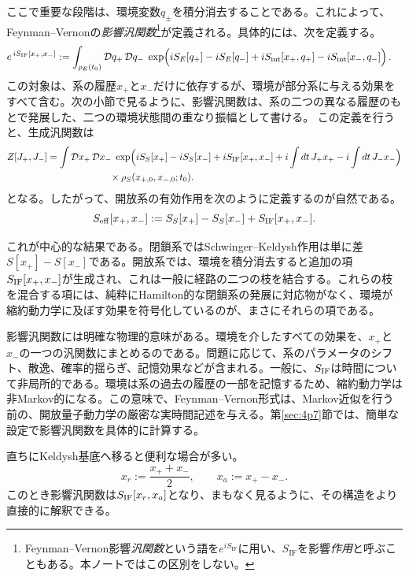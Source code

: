 \documentclass[a4paper,11pt,oneside]{article}
\theoremstyle{definition}
\numberwithin{equation}{section}
\begin{document}
ここで重要な段階は、環境変数\(q_\pm\)を積分消去することである。これによって、Feynman--Vernonの\textit{影響汎関数}\footnote{Feynman--Vernon影響\textit{汎関数}という語を$ e^{iS_{\mathrm{IF}}}$に用い、$S_{\mathrm{IF}}$を影響\textit{作用}と呼ぶこともある。本ノートではこの区別をしない。}\cite{FEYNMAN1963118}が定義される。具体的には、次を定義する。
\begin{align}
e^{\,iS_{\rm IF}[x_+,x_-]}
&:=
\int_{\rho_{E}(t_{0})} \mathcal D q_+\,\mathcal D q_-\;
\exp\Bigl(
iS_E[q_+] - iS_E[q_-]
+iS_{\rm int}[x_+,q_+]
-iS_{\rm int}[x_-,q_-]
\Bigr)\,.
\end{align}
この対象は、系の履歴\(x_+\)と\(x_-\)だけに依存するが、環境が部分系に与える効果をすべて含む。次の小節で見るように、影響汎関数は、系の二つの異なる履歴のもとで発展した、二つの環境状態間の重なり振幅として書ける。
この定義を行うと、生成汎関数は
\begin{align}
Z[J_+,J_-]
&=
\int \mathcal D x_+\,\mathcal D x_-\;
\exp\Bigl(
iS_S[x_+] - iS_S[x_-]
+iS_{\rm IF}[x_+,x_-]
+i\int dt\,J_+x_+
-i\int dt\,J_-x_-
\Bigr)
\nonumber\\
&\hspace{2.3cm}
\times
\rho_S(x_{+,0},x_{-,0};t_0) .
\end{align}
となる。したがって、開放系の有効作用を次のように定義するのが自然である。
\begin{equation}
S_{\rm eff}[x_+,x_-]
:=
S_S[x_+] - S_S[x_-] + S_{\rm IF}[x_+,x_-] .
\end{equation}


これが中心的な結果である。閉鎖系ではSchwinger--Keldysh作用は単に差\(S[x_+]-S[x_-]\)である。開放系では、環境を積分消去すると追加の項\(S_{\rm IF}[x_+,x_-]\)が生成され、これは一般に経路の二つの枝を結合する。これらの枝を混合する項には、純粋にHamilton的な閉鎖系の発展に対応物がなく、環境が縮約動力学に及ぼす効果を符号化しているのが、まさにそれらの項である。



影響汎関数には明確な物理的意味がある。環境を介したすべての効果を、\(x_+\)と\(x_-\)の一つの汎関数にまとめるのである。問題に応じて、系のパラメータのシフト、散逸、確率的揺らぎ、記憶効果などが含まれる。一般に、\(S_{\rm IF}\)は時間について非局所的である。環境は系の過去の履歴の一部を記憶するため、縮約動力学は非Markov的になる。この意味で、Feynman--Vernon形式は、Markov近似を行う前の、開放量子動力学の厳密な実時間記述を与える。第\ref{sec:4p7}節では、簡単な設定で影響汎関数を具体的に計算する。



直ちにKeldysh基底へ移ると便利な場合が多い。
\begin{equation}
x_r := \frac{x_+ + x_-}{2},
\qquad
x_a := x_+ - x_- .
\end{equation}
このとき影響汎関数は\(S_{\rm IF}[x_r,x_a]\)となり、まもなく見るように、その構造をより直接的に解釈できる。
\end{document}
